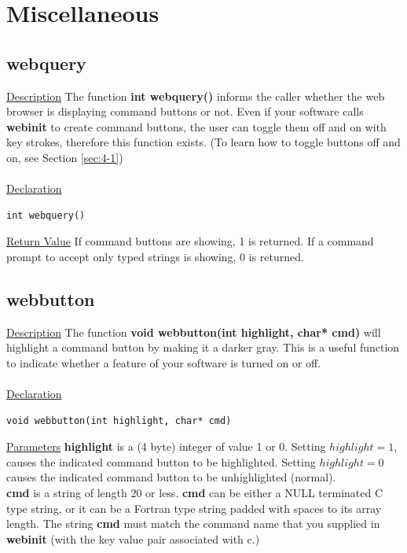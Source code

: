 \newpage
\section{Miscellaneous}

\subsection{webquery}
\underline{Description} The function \textbf{int webquery()} informs the caller whether the web browser is displaying command buttons or not. Even 
if your software calls \textbf{webinit} to create command buttons, the user can toggle them off and on with key strokes, therefore this function exists. 
(To learn how to toggle buttons off and on, see Section \ref{sec:4-1})\\
\\
\underline{Declaration}
\begin{verbatim}
int webquery()
\end{verbatim}
\underline{Return Value} If command buttons are showing, 1 is returned. If a command prompt to accept only typed strings is showing, 0 is returned.
\\
\subsection{webbutton}
\underline{Description} The function \textbf{void webbutton(int highlight, char* cmd)} will highlight a command button by making it a darker gray. This
is a useful function to indicate whether a feature of your software is turned on or off.\\
\\
\underline{Declaration}
\begin{verbatim}
void webbutton(int highlight, char* cmd)
\end{verbatim}
\underline{Parameters} \textbf{highlight} is a (4 byte) integer of value 1 or 0. Setting $highlight=1$, causes the indicated command button to be 
highlighted. Setting $highlight=0$ causes the indicated command button to be unhighlighted (normal).\\
\textbf{cmd} is a string of length 20 or less. \textbf{cmd} can be either a NULL terminated C type string, or it can be a Fortran type
string padded with spaces to its array length. The string \textbf{cmd} must match the command name that you supplied in \textbf{webinit} (with
the key value pair associated with c.)\\
\\
